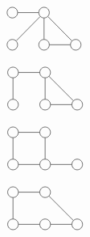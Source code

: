 \documentclass[12pt]{article}
\begin{document}
\begin{align*}
\begin{tikzpicture}
\node[shape=circle,draw=black] (A) at (0,0) {};
\node[shape=circle,draw=black] (B) at (1,0) {};
\node[shape=circle,draw=black] (C) at (0,-1) {};
\node[shape=circle,draw=black] (D) at (1,-1) {};
\node[shape=circle,draw=black] (E) at (2,-1) {};
\path [] (A) edge node[left] {} (B);
\path [] (C) edge node[left] {} (B);
\path [] (B) edge node[left] {} (D);
\path [] (B) edge node[left] {} (E);
\path [] (D) edge node[left] {} (E);
\end{tikzpicture}
\end{align*}

\begin{align*}
\begin{tikzpicture}
\node[shape=circle,draw=black] (A) at (0,0) {};
\node[shape=circle,draw=black] (B) at (1,0) {};
\node[shape=circle,draw=black] (C) at (0,-1) {};
\node[shape=circle,draw=black] (D) at (1,-1) {};
\node[shape=circle,draw=black] (E) at (2,-1) {};
\path [] (A) edge node[left] {} (B);
\path [] (C) edge node[left] {} (A);
\path [] (B) edge node[left] {} (D);
\path [] (B) edge node[left] {} (E);
\path [] (D) edge node[left] {} (E);
\end{tikzpicture}
\end{align*}


\begin{align*}
\begin{tikzpicture}
\node[shape=circle,draw=black] (A) at (0,0) {};
\node[shape=circle,draw=black] (B) at (1,0) {};
\node[shape=circle,draw=black] (C) at (0,-1) {};
\node[shape=circle,draw=black] (D) at (1,-1) {};
\node[shape=circle,draw=black] (E) at (2,-1) {};
\path [] (A) edge node[left] {} (B);
\path [] (C) edge node[left] {} (D);
\path [] (B) edge node[left] {} (D);
\path [] (A) edge node[left] {} (C);
\path [] (D) edge node[left] {} (E);
\end{tikzpicture}
\end{align*}

\begin{align*}
\begin{tikzpicture}
\node[shape=circle,draw=black] (A) at (0,0) {};
\node[shape=circle,draw=black] (B) at (1,0) {};
\node[shape=circle,draw=black] (C) at (0,-1) {};
\node[shape=circle,draw=black] (D) at (1,-1) {};
\node[shape=circle,draw=black] (E) at (2,-1) {};
\path [] (A) edge node[left] {} (B);
\path [] (B) edge node[left] {} (E);
\path [] (D) edge node[left] {} (E);
\path [] (A) edge node[left] {} (C);
\path [] (D) edge node[left] {} (C);
\end{tikzpicture}
\end{align*}
\end{document}
